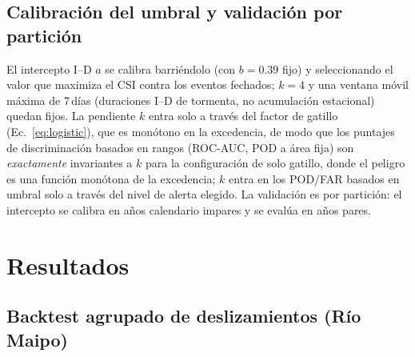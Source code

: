 \documentclass[authoryear,preprint,review,12pt]{elsarticle}
\begin{document}
\subsection{Calibración del umbral y validación por partición}

El intercepto I--D $a$ se calibra barriéndolo (con $b=0.39$ fijo) y seleccionando el
valor que maximiza el CSI contra los eventos fechados; $k=4$ y una ventana móvil
máxima de 7\,días (duraciones I--D de tormenta, no acumulación estacional) quedan
fijos. La pendiente $k$ entra solo a través del factor de gatillo
(Ec.~\ref{eq:logistic}), que es monótono en la excedencia, de modo que los puntajes
de discriminación basados en rangos (ROC-AUC, POD a área fija) son
\emph{exactamente} invariantes a $k$ para la configuración de solo gatillo, donde
el peligro es una función monótona de la excedencia; $k$ entra en los POD/FAR
basados en umbral solo a través del nivel de alerta elegido. La validación es por
partición: el intercepto se calibra en años calendario impares y se evalúa en años
pares.

\section{Resultados}

\subsection{Backtest agrupado de deslizamientos (Río Maipo)}
\label{sec:lumped}
\end{document}
